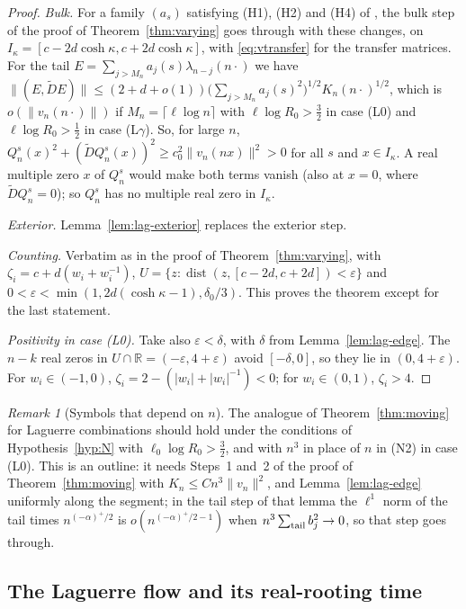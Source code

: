 \documentclass[11pt]{amsart}
\theoremstyle{definition}
\theoremstyle{remark}
\newtheorem{remark}[theorem]{Remark}
\numberwithin{equation}{section}
\newcommand{\R}{\mathbb{R}}
\newcommand{\eps}{\varepsilon}
\DeclareMathOperator{\dist}{dist}
\begin{document}
\begin{proof}
\emph{Bulk.} For a family $(a_s)$ satisfying (H1), (H2) and (H4) of \cite[Hypothesis~\ref{M-hyp:H}]{Main}, the bulk step of the proof of Theorem~\ref{thm:varying} goes through with these changes, on $I_\kappa=[c-2d\cosh\kappa,c+2d\cosh\kappa]$, with \eqref{eq:vtransfer} for the transfer matrices. For the tail $E=\sum_{j>M_n}a_j(s)\lambda_{n-j}(n\cdot)$ we have $\|(E,\widetilde DE)\|\le(2+d+o(1))\bigl(\sum_{j>M_n}a_j(s)^2\bigr)^{1/2}K_n(n\cdot)^{1/2}$, which is $o(\|v_n(n\cdot)\|)$ if $M_n=\lceil\ell\log n\rceil$ with $\ell\log R_0>\frac32$ in case (L0) and $\ell\log R_0>\frac12$ in case (L$\gamma$). So, for large $n$, $Q^s_n(x)^2+(\widetilde DQ^s_n(x))^2\ge c_0^2\|v_n(nx)\|^2>0$ for all $s$ and $x\in I_\kappa$. A real multiple zero $x$ of $Q^s_n$ would make both terms vanish (also at $x=0$, where $\widetilde DQ^s_n=0$); so $Q^s_n$ has no multiple real zero in $I_\kappa$.

\emph{Exterior.} Lemma~\ref{lem:lag-exterior} replaces the exterior step.

\emph{Counting.} Verbatim as in the proof of Theorem~\ref{thm:varying}, with $\zeta_i=c+d(w_i+w_i^{-1})$, $U=\{z:\dist(z,[c-2d,c+2d])<\eps\}$ and $0<\eps<\min(1,2d(\cosh\kappa-1),\delta_0/3)$. This proves the theorem except for the last statement.

\emph{Positivity in case (L0).} Take also $\eps<\delta$, with $\delta$ from Lemma~\ref{lem:lag-edge}. The $n-k$ real zeros in $U\cap\R=(-\eps,4+\eps)$ avoid $[-\delta,0]$, so they lie in $(0,4+\eps)$. For $w_i\in(-1,0)$, $\zeta_i=2-(|w_i|+|w_i|^{-1})<0$; for $w_i\in(0,1)$, $\zeta_i>4$.
\end{proof}

\begin{remark}[Symbols that depend on $n$]\label{rem:lag-moving}
The analogue of Theorem~\ref{thm:moving} for Laguerre combinations should hold under the conditions of Hypothesis~\ref{hyp:N} with $\ell_0\log R_0>\frac32$, and with $n^3$ in place of $n$ in (N2) in case (L0). This is an outline: it needs Steps~1 and~2 of the proof of Theorem~\ref{thm:moving} with $K_n\le Cn^3\|v_n\|^2$, and Lemma~\ref{lem:lag-edge} uniformly along the segment; in the tail step of that lemma the $\ell^1$ norm of the tail times $n^{(-\alpha)^+/2}$ is $o(n^{(-\alpha)^+/2-1})$ when $n^3\sum_{\rm tail}b_j^2\to0$, so that step goes through.
\end{remark}

\subsection{The Laguerre flow and its real-rooting time}\label{subsec:lag-flow}
\end{document}
